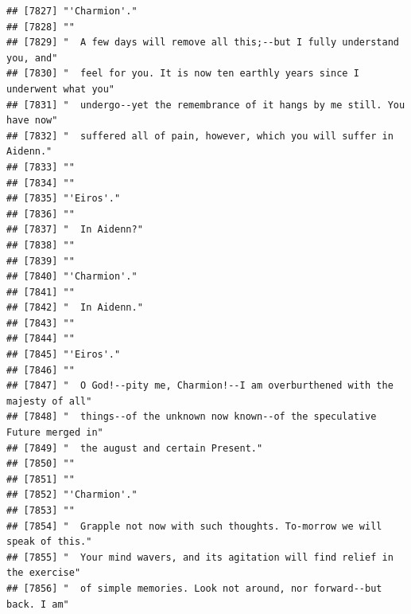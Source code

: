 \documentclass{article}\usepackage[]{graphicx}\usepackage[]{color}
\makeatletter
\newenvironment{kframe}{%
 \def\at@end@of@kframe{}%
 \ifinner\ifhmode%
  \def\at@end@of@kframe{\end{minipage}}%
  \begin{minipage}{\columnwidth}%
 \fi\fi%
 \def\FrameCommand##1{\hskip\@totalleftmargin \hskip-\fboxsep
 \colorbox{shadecolor}{##1}\hskip-\fboxsep
     \hskip-\linewidth \hskip-\@totalleftmargin \hskip\columnwidth}%
 \MakeFramed {\advance\hsize-\width
   \@totalleftmargin\z@ \linewidth\hsize
   \@setminipage}}%
 {\par\unskip\endMakeFramed%
 \at@end@of@kframe}
\newenvironment{knitrout}{}{} %
\makeatother
\begin{document}
\begin{knitrout}
\begin{kframe}
\begin{verbatim}
## [7827] "'Charmion'."                                                                 
## [7828] ""                                                                            
## [7829] "  A few days will remove all this;--but I fully understand you, and"         
## [7830] "  feel for you. It is now ten earthly years since I underwent what you"      
## [7831] "  undergo--yet the remembrance of it hangs by me still. You have now"        
## [7832] "  suffered all of pain, however, which you will suffer in Aidenn."           
## [7833] ""                                                                            
## [7834] ""                                                                            
## [7835] "'Eiros'."                                                                    
## [7836] ""                                                                            
## [7837] "  In Aidenn?"                                                                
## [7838] ""                                                                            
## [7839] ""                                                                            
## [7840] "'Charmion'."                                                                 
## [7841] ""                                                                            
## [7842] "  In Aidenn."                                                                
## [7843] ""                                                                            
## [7844] ""                                                                            
## [7845] "'Eiros'."                                                                    
## [7846] ""                                                                            
## [7847] "  O God!--pity me, Charmion!--I am overburthened with the majesty of all"    
## [7848] "  things--of the unknown now known--of the speculative Future merged in"     
## [7849] "  the august and certain Present."                                           
## [7850] ""                                                                            
## [7851] ""                                                                            
## [7852] "'Charmion'."                                                                 
## [7853] ""                                                                            
## [7854] "  Grapple not now with such thoughts. To-morrow we will speak of this."      
## [7855] "  Your mind wavers, and its agitation will find relief in the exercise"      
## [7856] "  of simple memories. Look not around, nor forward--but back. I am"          

\end{verbatim}
\end{kframe}
\end{knitrout}
\end{document}
